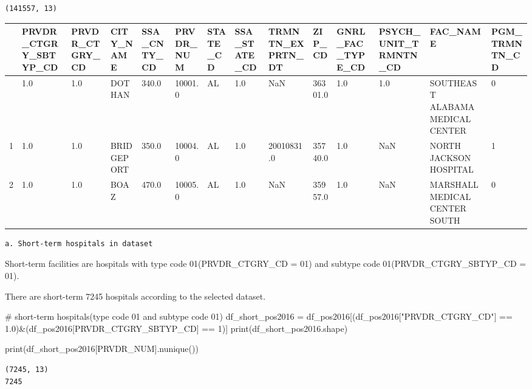 \documentclass[
  letterpaper,
  DIV=11,
  numbers=noendperiod]{scrartcl}
\newenvironment{Shaded}{\begin{snugshade}}{\end{snugshade}}
\newcommand{\BuiltInTok}[1]{\textcolor[rgb]{0.00,0.23,0.31}{#1}}
\newcommand{\CommentTok}[1]{\textcolor[rgb]{0.37,0.37,0.37}{#1}}
\newcommand{\DecValTok}[1]{\textcolor[rgb]{0.68,0.00,0.00}{#1}}
\newcommand{\FloatTok}[1]{\textcolor[rgb]{0.68,0.00,0.00}{#1}}
\newcommand{\NormalTok}[1]{\textcolor[rgb]{0.00,0.23,0.31}{#1}}
\newcommand{\OperatorTok}[1]{\textcolor[rgb]{0.37,0.37,0.37}{#1}}
\newcommand{\StringTok}[1]{\textcolor[rgb]{0.13,0.47,0.30}{#1}}
\begin{document}
\begin{verbatim}
(141557, 13)
\end{verbatim}

\begin{longtable}[]{@{}llllllllllllll@{}}
\toprule\noalign{}
& PRVDR\_CTGRY\_SBTYP\_CD & PRVDR\_CTGRY\_CD & CITY\_NAME &
SSA\_CNTY\_CD & PRVDR\_NUM & STATE\_CD & SSA\_STATE\_CD &
TRMNTN\_EXPRTN\_DT & ZIP\_CD & GNRL\_FAC\_TYPE\_CD &
PSYCH\_UNIT\_TRMNTN\_CD & FAC\_NAME & PGM\_TRMNTN\_CD \\
\midrule\noalign{}
\endhead
\bottomrule\noalign{}
\endlastfoot
0 & 1.0 & 1.0 & DOTHAN & 340.0 & 10001.0 & AL & 1.0 & NaN & 36301.0 &
1.0 & 1.0 & SOUTHEAST ALABAMA MEDICAL CENTER & 0 \\
1 & 1.0 & 1.0 & BRIDGEPORT & 350.0 & 10004.0 & AL & 1.0 & 20010831.0 &
35740.0 & 1.0 & NaN & NORTH JACKSON HOSPITAL & 1 \\
2 & 1.0 & 1.0 & BOAZ & 470.0 & 10005.0 & AL & 1.0 & NaN & 35957.0 & 1.0
& NaN & MARSHALL MEDICAL CENTER SOUTH & 0 \\
\end{longtable}

\begin{verbatim}
a. Short-term hospitals in dataset
\end{verbatim}

Short-term facilities are hospitals with type code 01(PRVDR\_CTGRY\_CD =
01) and subtype code 01(PRVDR\_CTGRY\_SBTYP\_CD = 01).

There are short-term 7245 hospitals according to the selected dataset.

\begin{Shaded}
\begin{Highlighting}[]
\CommentTok{\# short{-}term hospitals(type code 01 and subtype code 01)}
\NormalTok{df\_short\_pos2016 }\OperatorTok{=}\NormalTok{ df\_pos2016[(df\_pos2016[}\StringTok{"PRVDR\_CTGRY\_CD"}\NormalTok{] }\OperatorTok{==} \FloatTok{1.0}\NormalTok{)}\OperatorTok{\&}\NormalTok{(df\_pos2016[}\StringTok{\textquotesingle{}PRVDR\_CTGRY\_SBTYP\_CD\textquotesingle{}}\NormalTok{] }\OperatorTok{==} \DecValTok{1}\NormalTok{)]}
\BuiltInTok{print}\NormalTok{(df\_short\_pos2016.shape)}

\BuiltInTok{print}\NormalTok{(df\_short\_pos2016[}\StringTok{\textquotesingle{}PRVDR\_NUM\textquotesingle{}}\NormalTok{].nunique())}
\end{Highlighting}
\end{Shaded}

\begin{verbatim}
(7245, 13)
7245
\end{verbatim}
\end{document}
